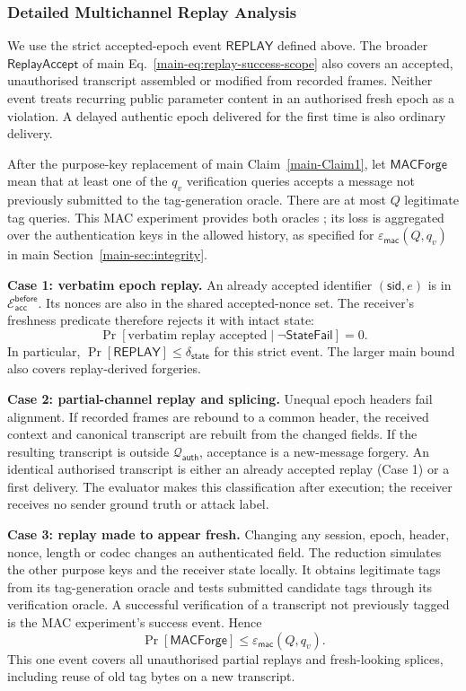 \documentclass[journal]{IEEEtran}
\theoremstyle{definition}
\theoremstyle{game}
\begin{document}
\subsubsection{Detailed Multichannel Replay Analysis}
\label{subsubsec:mc-replay}
We use the strict accepted-epoch event $\mathsf{REPLAY}$ defined above.
The broader $\mathsf{ReplayAccept}$ of main
Eq.~\eqref{main-eq:replay-success-scope} also covers an accepted,
unauthorised transcript assembled or modified from recorded frames.
Neither event treats recurring public parameter content in an authorised
fresh epoch as a violation. A delayed authentic epoch delivered for the
first time is also ordinary delivery.

After the purpose-key replacement of main Claim~\ref{main-Claim1}, let
$\mathsf{MACForge}$ mean that at least one of the $q_v$ verification
queries accepts a message not previously submitted to the tag-generation
oracle. There are at most $Q$ legitimate tag queries. This MAC experiment
provides both oracles \cite{BellareRogaway2005Notes}; its loss is aggregated
over the authentication keys in the allowed history, as specified for
$\varepsilon_{\mathsf{mac}}(Q,q_v)$ in main Section~\ref{main-sec:integrity}.

\textbf{Case 1: verbatim epoch replay.}
An already accepted identifier $(\mathsf{sid},e)$ is in
$\mathcal E_{\mathsf{acc}}^{\mathsf{before}}$. Its nonces are also in the
shared accepted-nonce set. The receiver's freshness predicate therefore
rejects it with intact state:
\begin{equation}\label{supp-eq:verbatim-replay}
\Pr[\text{verbatim replay accepted}\mid\neg\mathsf{StateFail}]=0.
\end{equation}
In particular, $\Pr[\mathsf{REPLAY}]\le\delta_{\mathsf{state}}$ for this
strict event. The larger main bound also covers replay-derived forgeries.

\textbf{Case 2: partial-channel replay and splicing.}
Unequal epoch headers fail alignment. If recorded frames are rebound to a
common header, the received context and canonical transcript are rebuilt
from the changed fields. If the resulting transcript is outside
$\mathcal Q_{\mathsf{auth}}$, acceptance is a new-message forgery.
An identical authorised transcript is either an already accepted replay
(Case 1) or a first delivery. The evaluator makes this classification after
execution; the receiver receives no sender ground truth or attack label.

\textbf{Case 3: replay made to appear fresh.}
Changing any session, epoch, header, nonce, length or codec changes an
authenticated field. The reduction simulates the other purpose keys and
the receiver state locally. It obtains legitimate tags from its
tag-generation oracle and tests submitted candidate tags through its
verification oracle. A successful verification of a transcript not
previously tagged is the MAC experiment's success event. Hence
\begin{equation}\label{supp-eq:aggregate-mac-forgery}
\Pr[\mathsf{MACForge}]\le\varepsilon_{\mathsf{mac}}(Q,q_v).
\end{equation}
This one event covers all unauthorised partial replays and fresh-looking
splices, including reuse of old tag bytes on a new transcript.
\end{document}
